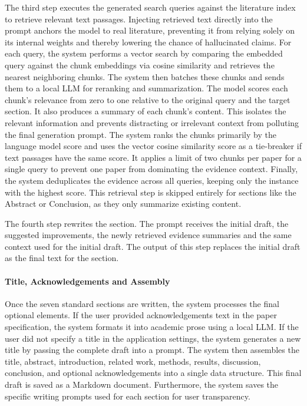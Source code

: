 The third step executes the generated search queries against the literature index to retrieve relevant text passages.
Injecting retrieved text directly into the prompt anchors the model to real literature, preventing it from relying solely on its internal weights and thereby lowering the chance of hallucinated claims.
For each query, the system performs a vector search by comparing the embedded query against the chunk embeddings via cosine similarity and retrieves the nearest neighboring chunks.
The system then batches these chunks and sends them to a local LLM for reranking and summarization.
The model scores each chunk's relevance from zero to one relative to the original query and the target section.
It also produces a summary of each chunk's content.
This isolates the relevant information and prevents distracting or irrelevant context from polluting the final generation prompt.
The system ranks the chunks primarily by the language model score and uses the vector cosine similarity score as a tie-breaker if text passages have the same score.
It applies a limit of two chunks per paper for a single query to prevent one paper from dominating the evidence context.
Finally, the system deduplicates the evidence across all queries, keeping only the instance with the highest score.
This retrieval step is skipped entirely for sections like the Abstract or Conclusion, as they only summarize existing content.

The fourth step rewrites the section.
The prompt receives the initial draft, the suggested improvements, the newly retrieved evidence summaries and the same context used for the initial draft.
The output of this step replaces the initial draft as the final text for the section.

\paragraph{Title, Acknowledgements and Assembly}
Once the seven standard sections are written, the system processes the final optional elements.
If the user provided acknowledgements text in the paper specification, the system formats it into academic prose using a local LLM.
If the user did not specify a title in the application settings, the system generates a new title by passing the complete draft into a prompt.
The system then assembles the title, abstract, introduction, related work, methods, results, discussion, conclusion, and optional acknowledgements into a single data structure.
This final draft is saved as a Markdown document. Furthermore, the system saves the specific writing prompts used for each section for user transparency.

